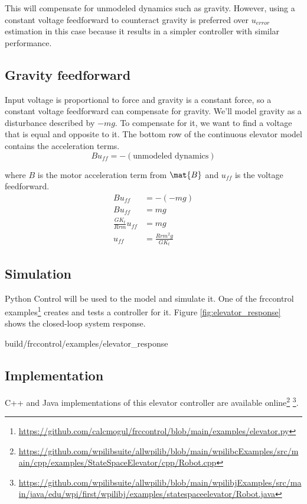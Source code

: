 This will compensate for unmodeled dynamics such as gravity. However, using a
constant voltage feedforward to counteract gravity is preferred over $u_{error}$
estimation in this case because it results in a simpler controller with similar
performance.

\subsection{Gravity feedforward}

Input voltage is proportional to force and gravity is a constant force, so a
constant voltage feedforward can compensate for gravity. We'll model gravity as
a disturbance described by $-mg$. To compensate for it, we want to find a
voltage that is equal and opposite to it. The bottom row of the continuous
elevator model contains the acceleration terms.
\begin{equation*}
  Bu_{ff} = -(\text{unmodeled dynamics})
\end{equation*}

where $B$ is the motor acceleration term from $\mat{B}$ and $u_{ff}$ is the
voltage feedforward.
\begin{align*}
  Bu_{ff} &= -(-mg) \\
  Bu_{ff} &= mg \\
  \frac{G K_t}{Rrm} u_{ff} &= mg \\
  u_{ff} &= \frac{Rrm^2 g}{G K_t}
\end{align*}

\subsection{Simulation}

Python Control will be used to  the
\gls{model} and simulate it. One of the frccontrol
examples\footnote{\url{https://github.com/calcmogul/frccontrol/blob/main/examples/elevator.py}}
creates and tests a controller for it. Figure \ref{fig:elevator_response} shows
the closed-loop \gls{system} response.
\begin{svg}{build/frccontrol/examples/elevator_response}
  \caption{Elevator response}
  \label{fig:elevator_response}
\end{svg}

\subsection{Implementation}

C++ and Java implementations of this elevator controller are available
online\footnote{\url{https://github.com/wpilibsuite/allwpilib/blob/main/wpilibcExamples/src/main/cpp/examples/StateSpaceElevator/cpp/Robot.cpp}}
\footnote{\url{https://github.com/wpilibsuite/allwpilib/blob/main/wpilibjExamples/src/main/java/edu/wpi/first/wpilibj/examples/statespaceelevator/Robot.java}}.
